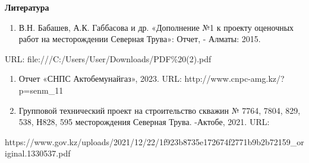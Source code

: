 {\bfseries Литература}

\begin{enumerate}
\def\labelenumi{\arabic{enumi}.}
\item
  В.Н. Бабашев, А.К. Габбасова и др. «Дополнение №1 к проекту оценочных
  работ на месторождении Северная Трува»: Отчет, - Алматы: 2015.
\end{enumerate}

URL: file:///C:/Users/User/Downloads/PDF\%20(2).pdf

\begin{enumerate}
\def\labelenumi{\arabic{enumi}.}
\setcounter{enumi}{1}
\item
  Отчет «СНПС Актобемунайгаз», 2023. URL:
  http://www.cnpc-amg.kz/?p=senm\_11
\item
  Групповой технический проект на строительство скважин № 7764, 7804,
  829, 538, Н828, 595 месторождения Северная Трува. -Актобе, 2021. URL:
\end{enumerate}

https://www.gov.kz/uploads/2021/12/22/1f923b8735e172674f2771b9b2b72159\_original.1330537.pdf

